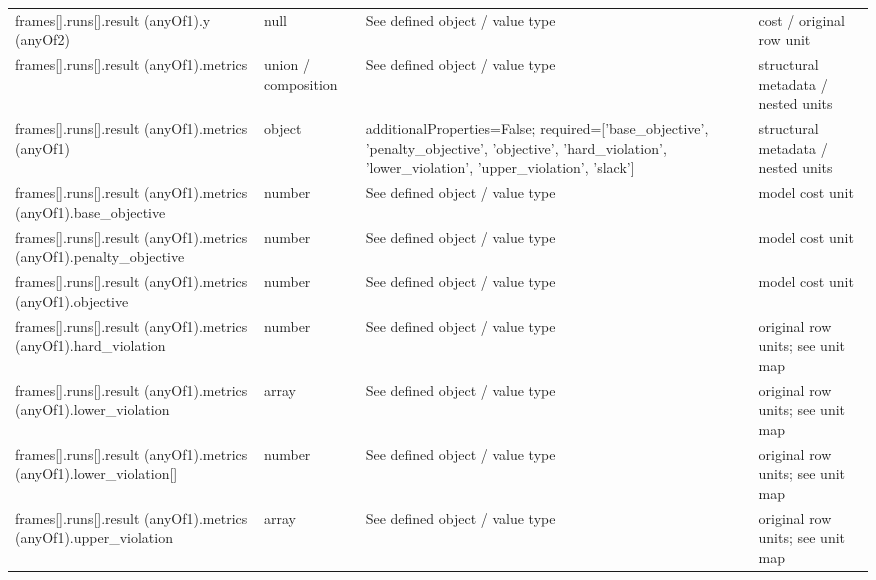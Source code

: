 \begin{longtable}{@{}>{\raggedright\arraybackslash}p{}>{\raggedright\arraybackslash}p{}>{\raggedright\arraybackslash}p{}>{\raggedright\arraybackslash}p{}@{}}
frames[].\allowbreak{}runs[].\allowbreak{}result (anyOf1).\allowbreak{}y (anyOf2) & null & See defined object /\allowbreak{} value type & cost /\allowbreak{} original row unit\\
frames[].\allowbreak{}runs[].\allowbreak{}result (anyOf1).\allowbreak{}metrics & union /\allowbreak{} composition & See defined object /\allowbreak{} value type & structural metadata /\allowbreak{} nested units\\
frames[].\allowbreak{}runs[].\allowbreak{}result (anyOf1).\allowbreak{}metrics (anyOf1) & object & additionalProperties=\allowbreak{}False; required=\allowbreak{}['base\_\allowbreak{}objective', 'penalty\_\allowbreak{}objective', 'objective', 'hard\_\allowbreak{}violation', 'lower\_\allowbreak{}violation', 'upper\_\allowbreak{}violation', 'slack'] & structural metadata /\allowbreak{} nested units\\
frames[].\allowbreak{}runs[].\allowbreak{}result (anyOf1).\allowbreak{}metrics (anyOf1).\allowbreak{}base\_\allowbreak{}objective & number & See defined object /\allowbreak{} value type & model cost unit\\
frames[].\allowbreak{}runs[].\allowbreak{}result (anyOf1).\allowbreak{}metrics (anyOf1).\allowbreak{}penalty\_\allowbreak{}objective & number & See defined object /\allowbreak{} value type & model cost unit\\
frames[].\allowbreak{}runs[].\allowbreak{}result (anyOf1).\allowbreak{}metrics (anyOf1).\allowbreak{}objective & number & See defined object /\allowbreak{} value type & model cost unit\\
frames[].\allowbreak{}runs[].\allowbreak{}result (anyOf1).\allowbreak{}metrics (anyOf1).\allowbreak{}hard\_\allowbreak{}violation & number & See defined object /\allowbreak{} value type & original row units; see unit map\\
frames[].\allowbreak{}runs[].\allowbreak{}result (anyOf1).\allowbreak{}metrics (anyOf1).\allowbreak{}lower\_\allowbreak{}violation & array & See defined object /\allowbreak{} value type & original row units; see unit map\\
frames[].\allowbreak{}runs[].\allowbreak{}result (anyOf1).\allowbreak{}metrics (anyOf1).\allowbreak{}lower\_\allowbreak{}violation[] & number & See defined object /\allowbreak{} value type & original row units; see unit map\\
frames[].\allowbreak{}runs[].\allowbreak{}result (anyOf1).\allowbreak{}metrics (anyOf1).\allowbreak{}upper\_\allowbreak{}violation & array & See defined object /\allowbreak{} value type & original row units; see unit map\\

\end{longtable}
